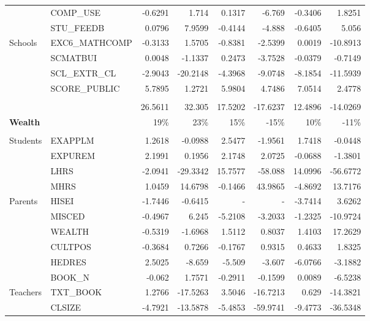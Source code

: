 \documentclass[10pt]{article}
\begin{document}
\begin{table}[htbp]
\begin{tabular}{llrrrrrr}
          & COMP\_USE & -0.6291 & 1.714 & 0.1317 & -6.769 & -0.3406 & 1.8251 \\[0.4em]
          & STU\_FEEDB & 0.0796 & 7.9599 & -0.4144 & -4.888 & -0.6405 & 5.056 \\[0.4em]
    Schools & EXC6\_MATHCOMP & -0.3133 & 1.5705 & -0.8381 & -2.5399 & 0.0019 & -10.8913 \\[0.4em]
          & SCMATBUI & 0.0048 & -1.1337 & 0.2473 & -3.7528 & -0.0379 & -0.7149 \\[0.4em]
          & SCL\_EXTR\_CL & -2.9043 & -20.2148 & -4.3968 & -9.0748 & -8.1854 & -11.5939 \\[0.4em]
          & SCORE\_PUBLIC & 5.7895 & 1.2721 & 5.9804 & 4.7486 & 7.0514 & 2.4778 \\[0.4em]
          	\cline{3-8} \\
          &       & 26.5611 & 32.305 & 17.5202 & -17.6237 & 12.4896 & -14.0269 \\[0.4em]
    \textbf{Wealth} &       & 19\%  & 23\%  & 15\%  & -15\% & 10\%  & -11\% \\
       \cline{3-8} \\
    Students & EXAPPLM & 1.2618 & -0.0988 & 2.5477 & -1.9561 & 1.7418 & -0.0448 \\[0.4em]
          & EXPUREM & 2.1991 & 0.1956 & 2.1748 & 2.0725 & -0.0688 & -1.3801 \\[0.4em]
          & LHRS  & -2.0941 & -29.3342 & 15.7577 & -58.088 & 14.0996 & -56.6772 \\[0.4em]
          & MHRS  & 1.0459 & 14.6798 & -0.1466 & 43.9865 & -4.8692 & 13.7176 \\[0.4em]
    Parents & HISEI & -1.7446 & -0.6415 & -     & -     & -3.7414 & 3.6262 \\[0.4em]
          & MISCED & -0.4967 & 6.245 & -5.2108 & -3.2033 & -1.2325 & -10.9724 \\[0.4em]
          & WEALTH & -0.5319 & -1.6968 & 1.5112 & 0.8037 & 1.4103 & 17.2629 \\[0.4em]
          & CULTPOS & -0.3684 & 0.7266 & -0.1767 & 0.9315 & 0.4633 & 1.8325 \\[0.4em]
          & HEDRES & 2.5025 & -8.659 & -5.509 & -3.607 & -6.0766 & -3.1882 \\[0.4em]
          & BOOK\_N & -0.062 & 1.7571 & -0.2911 & -0.1599 & 0.0089 & -6.5238 \\[0.4em]
    Teachers & TXT\_BOOK & 1.2766 & -17.5263 & 3.5046 & -16.7213 & 0.629 & -14.3821 \\[0.4em]
          & CLSIZE & -4.7921 & -13.5878 & -5.4853 & -59.9741 & -9.4773 & -36.5348 \\[0.4em]

\end{tabular}
\end{table}
\end{document}
